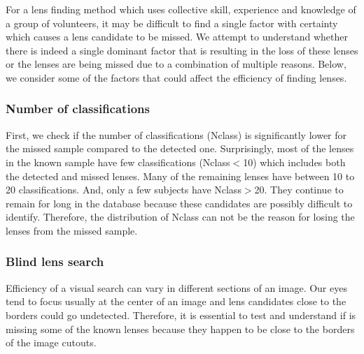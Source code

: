 \documentclass[useAMS,usenatbib,a4paper]{mn2e}
\begin{document}
For a lens finding method which uses collective skill, experience and
knowledge of a group of volunteers, it may be difficult to find a single
factor with certainty which causes a lens candidate to be missed. We
attempt to understand whether there is indeed a single dominant factor
that is resulting in the loss of these lenses or the lenses are being
missed due to a combination of multiple reasons. Below, we consider some
of the factors that could affect the efficiency of finding lenses.

\subsubsection{Number of classifications}
First, we check if the number of classifications (Nclass) is
significantly lower for the missed sample compared to the detected one.
Surprisingly, most of the lenses in the known sample have few
classifications (Nclass$<$10) which includes both the detected and
missed lenses. Many of the remaining lenses have between 10 to 20
classifications. And, only a few subjects have Nclass$>$20. They
continue to remain for long in the database because these candidates are
possibly difficult to identify. Therefore, the distribution of Nclass
can not be the reason for losing the lenses from the missed sample.


\subsubsection{Blind lens search}
Efficiency of a visual search can vary in different sections of an
image. Our eyes tend to focus usually at the center of an image and lens
candidates close to the borders could go undetected. Therefore, it is
essential to test and understand if \sw is missing some of the known lenses
because they happen to be close to the borders of the image cutouts.
\end{document}
